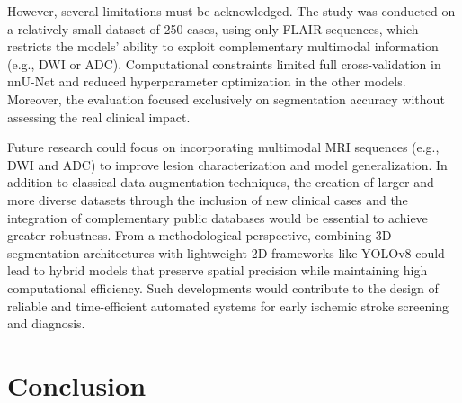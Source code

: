 \documentclass[12pt]{article}
\begin{document}
However, several limitations must be acknowledged. The study was conducted on a relatively small dataset of 250 cases, using only FLAIR sequences, which restricts the models’ ability to exploit complementary multimodal information (e.g., DWI or ADC). Computational constraints limited full cross-validation in nnU-Net and reduced hyperparameter optimization in the other models. Moreover, the evaluation focused exclusively on segmentation accuracy without assessing the real clinical impact.

Future research could focus on incorporating multimodal MRI sequences (e.g., DWI and ADC) to improve lesion characterization and model generalization. In addition to classical data augmentation techniques, the creation of larger and more diverse datasets through the inclusion of new clinical cases and the integration of complementary public databases would be essential to achieve greater robustness. From a methodological perspective, combining 3D segmentation architectures with lightweight 2D frameworks like YOLOv8 could lead to hybrid models that preserve spatial precision while maintaining high computational efficiency. Such developments would contribute to the design of reliable and time-efficient automated systems for early ischemic stroke screening and diagnosis.

\section{Conclusion} 
\label{sec:conclusion}

\end{document}
